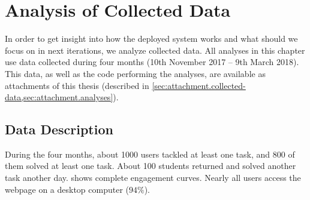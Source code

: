 \chapter{Analysis of Collected Data}
\label{chap:analysis}


In order to get insight into how the deployed system works
and what should we focus on in next iterations,
we analyze collected data.
All analyses in this chapter use data collected  %
during four months (10th November 2017 -- 9th March 2018).
This data, as well as the code performing the analyses, are available
as attachments of this thesis
(described in \cref{sec:attachment.collected-data,sec:attachment.analyses}).


\section{Data Description}

During the four months, about 1000 users tackled at least one task,
and 800 of them solved at least one task.
About 100 students returned and solved another task another day.
 shows complete engagement curves.
Nearly all users access the webpage on a desktop computer ($94\%$).

